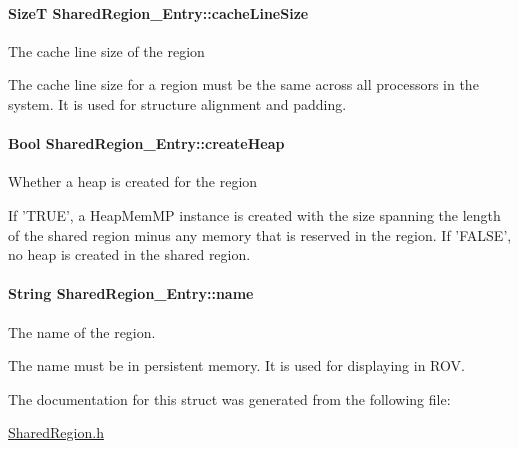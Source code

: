 \paragraph[{cacheLineSize}]{\setlength{\rightskip}{0pt plus 5cm}SizeT {\bf SharedRegion\_\-Entry::cacheLineSize}}\hfill\label{struct_shared_region___entry_ad083825edd4d4a99389328d87976e4c5}
The cache line size of the region

The cache line size for a region must be the same across all processors in the system. It is used for structure alignment and padding. 
\paragraph[{createHeap}]{\setlength{\rightskip}{0pt plus 5cm}Bool {\bf SharedRegion\_\-Entry::createHeap}}\hfill\label{struct_shared_region___entry_a5db88d5d170d041d872527e9b5b71020}
Whether a heap is created for the region

If 'TRUE', a HeapMemMP instance is created with the size spanning the length of the shared region minus any memory that is reserved in the region. If 'FALSE', no heap is created in the shared region. 
\paragraph[{name}]{\setlength{\rightskip}{0pt plus 5cm}String {\bf SharedRegion\_\-Entry::name}}\hfill\label{struct_shared_region___entry_a1e87b924f55373c770d8d5add58b9267}
The name of the region.

The name must be in persistent memory. It is used for displaying in ROV. 

The documentation for this struct was generated from the following file:\begin{DoxyCompactItemize}
\item 
\hyperlink{_shared_region_8h}{SharedRegion.h}\end{DoxyCompactItemize}
